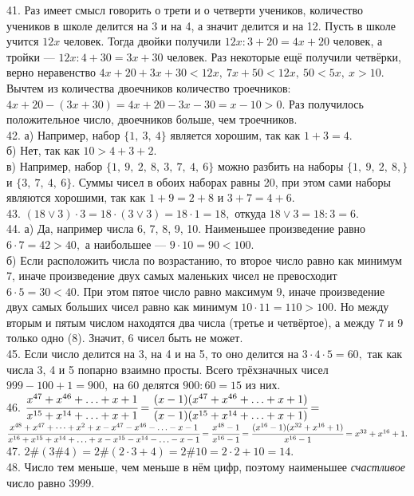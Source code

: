 \documentclass[12pt]{article}
\begin{document}
41. Раз имеет смысл говорить о трети и о четверти учеников, количество учеников в школе делится на 3 и на 4, а значит делится и на 12. Пусть в школе учится $12x$ человек. Тогда двойки получили $12x:3+20=4x+20$ человек, а тройки --- $12x:4+30=3x+30$ человек. Раз некоторые ещё получили четвёрки, верно неравенство $4x+20+3x+30<12x,\ 7x+50<12x,\ 50<5x,\ x>10.$ Вычтем из количества двоечников количество троечников: $4x+20-(3x+30)=4x+20-3x-30=x-10>0.$ Раз получилось положительное число, двоечников больше, чем троечников.\\
42. а) Например, набор $\{1,\ 3,\ 4\}$ является хорошим, так как $1+3=4.$\\
б) Нет, так как $10>4+3+2.$\\
в) Например, набор $\{1,\ 9,\ 2,\ 8,\ 3,\ 7,\ 4,\ 6\}$ можно разбить на наборы $\{1,\ 9,\ 2,\ 8,\}$ и $\{3,\ 7,\ 4,\ 6\}.$ Суммы чисел в обоих наборах равны 20, при этом сами наборы являются хорошими, так как $1+9=2+8$ и $3+7=4+6.$\\
43. $(18\vee 3)\cdot3=18\cdot(3\vee3)=18\cdot1=18,$ откуда $18\vee3=18:3=6.$\\
44. а) Да, например числа 6, 7, 8, 9, 10. Наименьшее произведение равно $6\cdot7=42>40,$ а наибольшее --- $9\cdot10=90<100.$\\
б) Если расположить числа по возрастанию, то второе число равно как минимум 7, иначе произведение двух самых маленьких чисел не превосходит $6\cdot5=30<40.$ При этом пятое число равно максимум 9, иначе произведение двух самых больших чисел равно как минимум $10\cdot11=110>100.$ Но между вторым и пятым числом находятся два числа (третье и четвёртое), а между 7 и 9 только одно (8). Значит, 6 чисел быть не может.\\
45. Если число делится на 3, на 4 и на 5, то оно делится на $3\cdot4\cdot5=60,$ так как числа 3, 4 и 5 попарно взаимно просты. Всего трёхзначных чисел $999-100+1=900,$ на 60 делятся $900:60=15$ из них.\\
46. $\cfrac{x^{47}+x^{46}+\ldots+x+1}{x^{15}+x^{14}+\ldots+x+1}=\cfrac{(x-1)(x^{47}+x^{46}+\ldots+x+1)}{(x-1)(x^{15}+x^{14}+\ldots+x+1)}=$\\$
\cfrac{x^{48}+x^{47}+\cdots+x^2+x-x^{47}-x^{46}-\ldots-x-1}{x^{16}+x^{15}+x^{14}+\ldots+x-x^{15}-x^{14}-\ldots-x-1}=\cfrac{x^{48}-1}{x^{16}-1}=
\cfrac{(x^{16}-1)(x^{32}+x^{16}+1)}{x^{16}-1}=x^{32}+x^{16}+1.$\\
47. $2\#(3\#4)=2\#(2\cdot3+4)=2\#10=2\cdot2+10=14.$\\
48. Число тем меньше, чем меньше в нём цифр, поэтому наименьшее {\it счастливое} число равно 3999.\\
\end{document}
